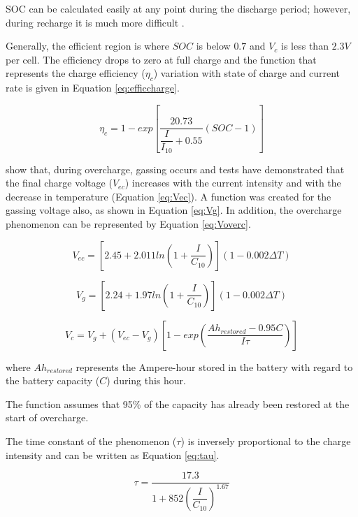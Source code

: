 SOC can be calculated easily at any point during the discharge period; however, during recharge it is much more difficult \cite{Copetti}.

Generally, the efficient region is where $ SOC $ is below $ 0.7 $ and $ V_{c} $ is less than $2.3 V$ per cell. The efficiency drops to zero at full charge and the function that represents the charge efficiency ($ \eta_{c} $) variation with state of charge and current rate is given in Equation \ref{eq:efficcharge}.

\begin{equation}
\label{eq:efficcharge}
\eta_{c} = 1 - exp \left[ \dfrac{20.73}{\dfrac{I}{I_{10}}+0.55} (SOC-1) \right] 
\end{equation}

\cite{Copetti} show that, during overcharge, gassing occurs and tests have demonstrated that the final charge voltage ($ V_{ec} $) increases with the current intensity and with the decrease in temperature (Equation \ref{eq:Vec}). A function was created for the gassing voltage also, as shown in Equation \ref{eq:Vg}. In addition, the overcharge phenomenon can be represented by Equation \ref{eq:Voverc}.

\begin{equation}
\label{eq:Vec}
V_{ec} = \left[ 2.45 + 2.011 ln \left( 1+\dfrac{I}{C_{10}} \right)  \right] (1-0.002 \Delta T)
\end{equation}

\begin{equation}
\label{eq:Vg}
V_{g} = \left[ 2.24 + 1.97 ln \left( 1+\dfrac{I}{C_{10}} \right)  \right] (1-0.002 \Delta T)
\end{equation}

\begin{equation}
\label{eq:Voverc}
V_{c} = V_{g} + (V_{ec} - V_{g}) \left[ 1- exp \left( \dfrac{Ah_{restored}-0.95C}{I\tau}  \right)    \right] 
\end{equation}

\noindent where $ Ah_{restored} $ represents the Ampere-hour stored in the battery with regard to the battery capacity ($ C $) during this hour.

The function assumes that 95\% of the capacity has already been restored at the start of overcharge.

The time constant of the phenomenon ($ \tau $) is inversely proportional to the charge intensity and can be written as Equation \ref{eq:tau}.

\begin{equation}
\label{eq:tau}
\tau = \dfrac{17.3}{1+852 \left( \dfrac{I}{C_{10}} \right) ^{1.67} }
\end{equation}

